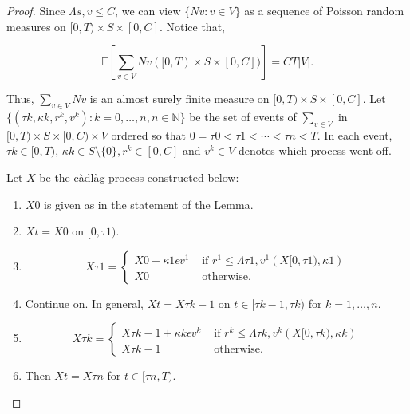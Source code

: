 \documentclass[12pt]{article}
\newcommand{\mb}{\mathbb}
\newcommand{\te}{\text}
\newcommand{\ep}{\epsilon}
\newcommand{\ind}{\hspace{24pt}}
\newcommand{\ex}[1]{\mb{E}\left[#1\right]}			%
\renewcommand{\v}{v}							%
\renewcommand{\S}{S}							%
\newcommand{\ev}{\ep}							%
\newcommand{\T}{T}								%
\renewcommand{\t}{t}							%
\renewcommand{\tt}{s}							%
\newcommand{\X}{X}								%
\newcommand{\const}{C}							%
\newcommand{\poiss}{N}							%
\renewcommand{\r}{r}							%
\newcommand{\rt}{\tau}							%
\renewcommand{\it}{k}							%
\renewcommand{\mark}{\kappa}					%
\newcommand{\ratee}{\Lambda}					%
\begin{document}
\begin{proof}
Since \(\ratee{\tt,\v} \leq \const{}\), we can view \(\{\poiss{\v}:\v\in V\}\) as a sequence of Poisson random measures on \([0,\T)\times \S\times [0,\const{}]\). Notice that,

\[\ex{\sum_{\v\in V}\poiss{\v}([0,\T)\times\S\times[0,\const{}])} = \const{}\T| V|.\]

Thus, \(\sum_{\v\in V}\poiss{\v}\) is an almost surely finite measure on \([0,\T)\times \S\times [0,\const{}]\). Let \(\{(\rt{\it},\mark{\it},\r^\it,\v^\it):\it = 0,\dots,n, n\in \mb{N}\}\) be the set of events of \(\sum_{\v\in V}\) in \([0,\T)\times\S\times [0,\const{})\times  V\) ordered so that \(0=\rt{0} < \rt{1} < \cdots < \rt{n} < \T\). In each event, \(\rt{\it} \in [0,\T)\), \(\mark{\it}\in \S\setminus\{0\}, \r^\it \in [0,\const{}]\) and \(\v^\it \in  V\) denotes which process went off.

\ind Let \(\X{}{}\) be the c\`adl\`ag process constructed below:

\begin{enumerate}
\item \(\X{}{0}\) is given as in the statement of the Lemma.

\item \(\X{}{\t} = \X{}{0}\) on \([0,\rt{1})\).

\item 

\[\X{}{\rt{1}} = \begin{cases}
\X{}{0} + \mark{1}\ev{\v^1} &\te{ if } \r^1 \leq \ratee{\rt{1},\v^1}(\X{}{[0,\rt{1})},\mark{1})\\
\X{}{0} &\te{ otherwise.}
\end{cases}
\] 

\item Continue on. In general, \(\X{}{\t} = \X{}{\rt{\it-1}}\) on \(\t \in [\rt{\it-1},\rt{\it})\) for \(\it= 1,\dots,n\).

\item 

\[\X{}{\rt{\it}} = \begin{cases}
\X{}{\rt{\it-1}} + \mark{\it}\ev{\v^\it} &\te{ if } \r^\it \leq \ratee{\rt{\it},\v^\it}(\X{}{[0,\rt{\it})},\mark{\it})\\
\X{}{\rt{\it-1}} &\te{ otherwise.}
\end{cases}\]

\item Then \(\X{}{\t} = \X{}{\rt{n}}\) for \(\t\in [\rt{n},\T)\).
\end{enumerate}


\end{proof}
\end{document}
